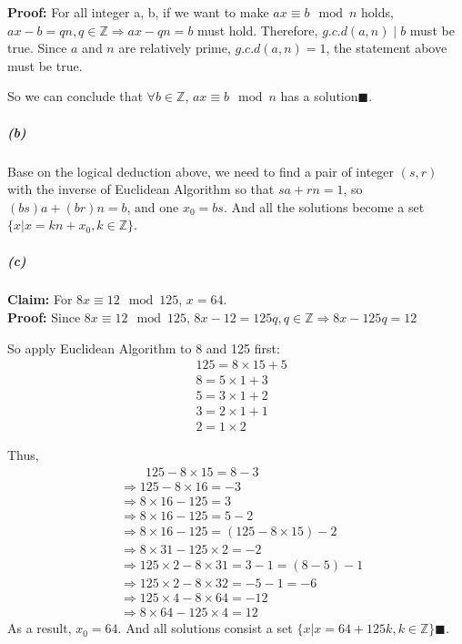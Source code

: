 \documentclass{article}[11pt]
\begin{document}
			\textbf{Proof: } For all integer a, b, if we want to make $ax \equiv b \mod n$ holds, $ax - b = qn, q \in \mathbb{Z} \Rightarrow ax - qn = b$ must hold. Therefore, $g.c.d(a, n) \mid b$ must be true. Since $a$ and $n$ are relatively prime, $g.c.d(a, n) = 1$, the statement above must be true.
		
		So we can conclude that $\forall b \in \mathbb{Z}$, $ax\equiv b\mod n$ has a solution$\blacksquare$.
		\subparagraph{(b)}
			Base on the logical deduction above, we need to find a pair of integer $(s, r)$ with the inverse of Euclidean Algorithm so that $sa + rn = 1$, so $(bs)a + (br)n = b$, and one $x_0 = bs$. And all the solutions become a set $\{x | x = kn + x_0, k \in \mathbb{Z}\}$.
		\subparagraph{(c)}
			\textbf{Claim:} For $8x \equiv 12 \mod 125$, $x = 64$.\\
			
			\textbf{Proof:} Since $8x \equiv 12 \mod 125$, $8x - 12 = 125q, q \in \mathbb{Z} \Rightarrow 8x - 125q = 12$
			
			So apply Euclidean Algorithm to 8 and 125 first:
			\begin{align}
				&125 = 8 \times 15 + 5\nonumber\\
				&8 = 5 \times 1 + 3\nonumber\\
				&5 = 3 \times 1 + 2\nonumber\\
				&3 = 2 \times 1 + 1\nonumber\\
				&2 = 1 \times 2\nonumber
			\end{align}
				
			Thus,
			\begin{align}
				&\phantom{\Rightarrow\ \ }125 - 8 \times 15 = 8 - 3\nonumber\\
				&\Rightarrow125 - 8 \times 16 = -3\nonumber\\
				&\Rightarrow8 \times 16 - 125 = 3\nonumber\\
				&\Rightarrow8 \times 16 - 125 = 5 - 2\nonumber\\
				&\Rightarrow8 \times 16 - 125 = (125 - 8 \times 15) - 2\nonumber\\
				&\Rightarrow8 \times 31 - 125 \times 2 = -2\nonumber\\
				&\Rightarrow125 \times 2 - 8 \times 31 = 3 - 1 = (8 - 5) - 1\nonumber\\
				&\Rightarrow125 \times 2 - 8 \times 32 = - 5 - 1 = -6\nonumber\\
				&\Rightarrow125 \times 4 - 8 \times 64 = -12\nonumber\\
				&\Rightarrow8 \times 64 - 125 \times 4 = 12\nonumber
			\end{align} 
			As a result, $x_0 = 64$. And all solutions consist a set $\{x | x = 64 + 125k, k \in \mathbb{Z}\}\blacksquare$.
\end{document}
